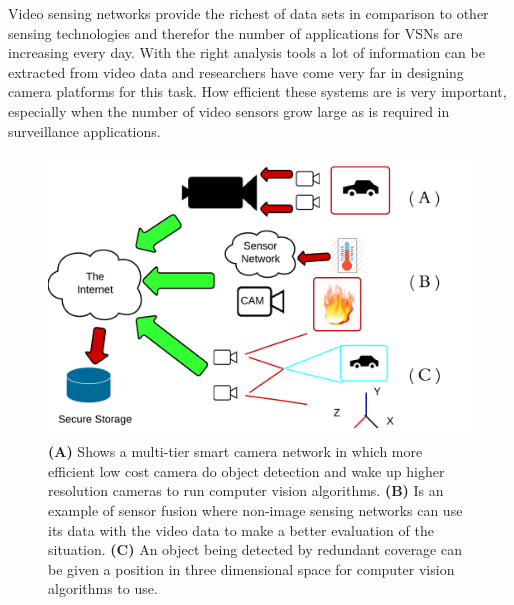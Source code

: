 \documentclass[journal,transmag]{IEEEtran}
\begin{document}
Video sensing networks provide the richest of data sets in comparison to other sensing technologies and therefor the number of applications for VSNs are increasing every day.
With the right analysis tools a lot of information can be extracted from video data and researchers have come very far in designing camera platforms for this task. How efficient
these systems are is very important, especially when the number of video sensors grow large as is required in surveillance applications.\\



\begin{figure}
\centering
\includegraphics[scale=0.3]{CameraDepolymentsFigure.png}
\caption{\textbf{(A)} Shows a multi-tier smart camera network in which more efficient low cost camera do object detection and wake up higher resolution cameras to run computer
vision algorithms. \textbf{(B)} Is an example of sensor fusion where non-image sensing networks can use its data with the video data to make a better evaluation of the situation.
\textbf{(C)} An object being detected by redundant coverage can be given a position in three dimensional space for computer vision algorithms to use.}
\end{figure}
\end{document}
